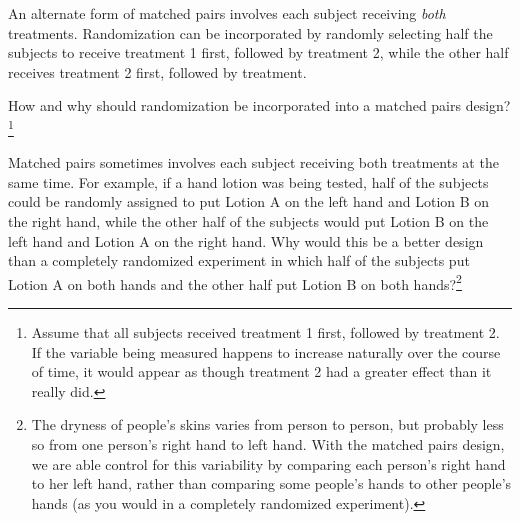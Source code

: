 An alternate form of matched pairs involves each subject receiving \emph{both} treatments. Randomization can be incorporated by randomly selecting half the subjects to receive treatment 1 first, followed by treatment 2, while the other half receives treatment 2 first, followed by treatment.

\begin{exercise}
How and why should randomization be incorporated into a matched pairs design?\footnote{Assume that all subjects received treatment 1 first, followed by treatment 2. If the variable being measured happens to increase naturally over the course of time, it would appear as though treatment 2 had a greater effect than it really did.} 
\end{exercise}


\begin{exercise}
Matched pairs sometimes involves each subject receiving both treatments at the same time. For example, if a hand lotion was being tested, half of the subjects could be randomly assigned to put Lotion A on the left hand and Lotion B on the right hand, while the other half of the subjects would put Lotion B on the left hand and Lotion A on the right hand. Why would this be a better design than a completely randomized experiment in which half of the subjects put Lotion A on both hands and the other half put Lotion B on both hands?\footnote{The dryness of people's skins varies from person to person, but probably less so from one person's right hand to left hand. With the matched pairs design, we are able control for this variability by comparing each person's right hand to her left hand, rather than comparing some people's hands to other people's hands (as you would in a completely randomized experiment).} %
\end{exercise}


